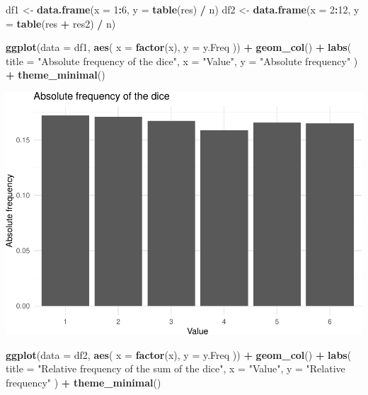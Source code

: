 \documentclass[
]{article}
\newenvironment{Shaded}{\begin{snugshade}}{\end{snugshade}}
\newcommand{\DataTypeTok}[1]{\textcolor[rgb]{0.13,0.29,0.53}{#1}}
\newcommand{\DecValTok}[1]{\textcolor[rgb]{0.00,0.00,0.81}{#1}}
\newcommand{\KeywordTok}[1]{\textcolor[rgb]{0.13,0.29,0.53}{\textbf{#1}}}
\newcommand{\NormalTok}[1]{#1}
\newcommand{\OperatorTok}[1]{\textcolor[rgb]{0.81,0.36,0.00}{\textbf{#1}}}
\newcommand{\StringTok}[1]{\textcolor[rgb]{0.31,0.60,0.02}{#1}}
\begin{document}
\begin{Shaded}
\begin{Highlighting}[]
\NormalTok{df1 \textless{}{-}}\StringTok{ }\KeywordTok{data.frame}\NormalTok{(}\DataTypeTok{x =} \DecValTok{1}\OperatorTok{:}\DecValTok{6}\NormalTok{, }\DataTypeTok{y =} \KeywordTok{table}\NormalTok{(res) }\OperatorTok{/}\StringTok{ }\NormalTok{n)}
\NormalTok{df2 \textless{}{-}}\StringTok{ }\KeywordTok{data.frame}\NormalTok{(}\DataTypeTok{x =} \DecValTok{2}\OperatorTok{:}\DecValTok{12}\NormalTok{, }\DataTypeTok{y =} \KeywordTok{table}\NormalTok{(res }\OperatorTok{+}\StringTok{ }\NormalTok{res2) }\OperatorTok{/}\StringTok{ }\NormalTok{n)}

\KeywordTok{ggplot}\NormalTok{(}\DataTypeTok{data =}\NormalTok{ df1, }\KeywordTok{aes}\NormalTok{(}
  \DataTypeTok{x =} \KeywordTok{factor}\NormalTok{(x),}
  \DataTypeTok{y =}\NormalTok{ y.Freq}
\NormalTok{)) }\OperatorTok{+}
\StringTok{  }\KeywordTok{geom\_col}\NormalTok{() }\OperatorTok{+}
\StringTok{  }\KeywordTok{labs}\NormalTok{(}
    \DataTypeTok{title =} \StringTok{"Absolute frequency of the dice"}\NormalTok{,}
    \DataTypeTok{x =} \StringTok{"Value"}\NormalTok{, }\DataTypeTok{y =} \StringTok{"Absolute frequency"}
\NormalTok{  ) }\OperatorTok{+}
\StringTok{  }\KeywordTok{theme\_minimal}\NormalTok{()}
\end{Highlighting}
\end{Shaded}

\includegraphics{es_files/figure-latex/unnamed-chunk-11-1.pdf}

\begin{Shaded}
\begin{Highlighting}[]
\KeywordTok{ggplot}\NormalTok{(}\DataTypeTok{data =}\NormalTok{ df2, }\KeywordTok{aes}\NormalTok{(}
  \DataTypeTok{x =} \KeywordTok{factor}\NormalTok{(x),}
  \DataTypeTok{y =}\NormalTok{ y.Freq}
\NormalTok{)) }\OperatorTok{+}
\StringTok{  }\KeywordTok{geom\_col}\NormalTok{() }\OperatorTok{+}
\StringTok{  }\KeywordTok{labs}\NormalTok{(}
    \DataTypeTok{title =} \StringTok{"Relative frequency of the sum of the dice"}\NormalTok{,}
    \DataTypeTok{x =} \StringTok{"Value"}\NormalTok{, }\DataTypeTok{y =} \StringTok{"Relative frequency"}
\NormalTok{  ) }\OperatorTok{+}
\StringTok{  }\KeywordTok{theme\_minimal}\NormalTok{()}
\end{Highlighting}
\end{Shaded}
\end{document}
